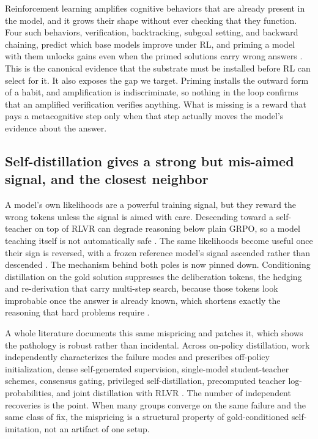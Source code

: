 Reinforcement learning amplifies cognitive behaviors that are already present in
the model, and it grows their shape without ever checking that they function.
Four such behaviors, verification, backtracking, subgoal setting, and backward
chaining, predict which base models improve under RL, and priming a model with
them unlocks gains even when the primed solutions carry wrong answers
\citep{gandhi2025cognitive}. This is the canonical evidence that the substrate
must be installed before RL can select for it. It also exposes the gap we
target. Priming installs the outward form of a habit, and amplification is
indiscriminate, so nothing in the loop confirms that an amplified verification
verifies anything. What is missing is a reward that pays a metacognitive step
only when that step actually moves the model's evidence about the answer.

\subsection{Self-distillation gives a strong but mis-aimed signal, and the closest neighbor}
\label{sec:related:selfdistill}

A model's own likelihoods are a powerful training signal, but they reward the
wrong tokens unless the signal is aimed with care. Descending toward a
self-teacher on top of RLVR can degrade reasoning below plain GRPO, so a model
teaching itself is not automatically safe \citep{kim2026selfdistill}. The same
likelihoods become useful once their sign is reversed, with a frozen reference
model's signal ascended rather than descended \citep{kim2026rebellious}. The
mechanism behind both poles is now pinned down. Conditioning distillation on the
gold solution suppresses the deliberation tokens, the hedging and re-derivation
that carry multi-step search, because those tokens look improbable once the
answer is already known, which shortens exactly the reasoning that hard problems
require \citep{whydegrade2026}.

A whole literature documents this same mispricing and patches it, which shows
the pathology is robust rather than incidental. Across on-policy distillation,
work independently characterizes the failure modes and prescribes off-policy
initialization, dense self-generated supervision, single-model student-teacher
schemes, consensus gating, privileged self-distillation, precomputed teacher
log-probabilities, and joint distillation with RLVR
\citep{opd2026rethinking, sdzero2026, opsd2025, gates2025, hdpo2025,
lightning_opd2026, mulgund2026rlsd}. The number of independent recoveries is the
point. When many groups converge on the same failure and the same class of fix,
the mispricing is a structural property of gold-conditioned self-imitation, not
an artifact of one setup.

